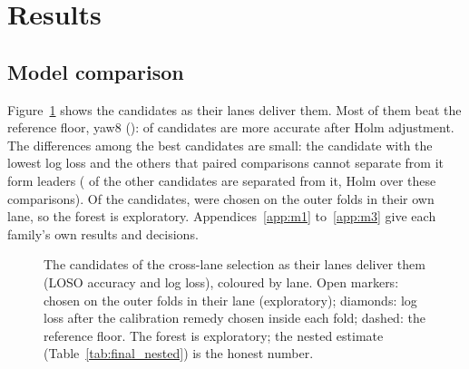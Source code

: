 \section{Results}\label{sec:results}

\subsection{Model comparison}\label{sec:results:comparison}
Figure~\ref{fig:FINAL_01_master_forest} shows the  candidates as their lanes deliver them.
Most of them beat the reference floor, yaw8 ():  of
 candidates are more accurate after Holm adjustment. The differences among the best
candidates are small: the candidate with the lowest log loss and the others that paired comparisons cannot separate
from it form  leaders ( of the  other
candidates are separated from it, Holm over these  comparisons). Of the candidates,  were
chosen on the outer folds in their own lane, so the forest is exploratory. Appendices~\ref{app:m1}
to~\ref{app:m3} give each family's own results and decisions.

\begin{figure}[htbp]
\centering
{}
\caption{The  candidates of the cross-lane selection as their lanes deliver them (LOSO
accuracy and log loss), coloured by lane. Open markers: chosen on the outer folds in their lane (exploratory);
diamonds: log loss after the calibration remedy chosen inside each fold; dashed: the reference floor. The forest is
exploratory; the nested estimate (Table~\ref{tab:final_nested}) is the honest number.}
\label{fig:FINAL_01_master_forest}
\end{figure}

